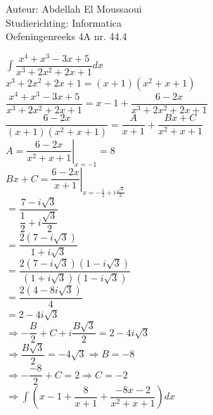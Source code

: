 \documentclass[a4paper]{article}
\begin{document}
  
\noindent \large Auteur: Abdellah El Moussaoui \\
\noindent \large Studierichting: Informatica\\
\noindent \large Oefeningenreeks 4A nr. 44.4\\

\medskip

\normalsize

$\displaystyle\int \dfrac{x^4+x^3-3x+5}{x^3+2x^2+2x+1}dx$\\

$x^3+2x^2+2x+1 = \left(x+1\right)\left(x^2+x+1\right)$\\

$\dfrac{x^4+x^3-3x+5}{x^3+2x^2+2x+1} = x-1+\dfrac{6-2x}{x^3+2x^2+2x+1}$\\

$\dfrac{6-2x}{\left(x+1\right)\left(x^2+x+1\right)} = \dfrac{A}{x+1}+\dfrac{Bx+C}{x^2+x+1}$\\

$A = \left.\dfrac{6-2x}{x^2+x+1}\right|_{x = -1} = 8$\\

$Bx + C = \left.\dfrac{6-2x}{x+1}\right|_{x = -\tfrac{1}{2}+i\tfrac{\sqrt3}{2}}$\\

$ = \dfrac{7-i\sqrt3}{\dfrac{1}{2}+i\dfrac{\sqrt3}{2}}$\\

$ = \dfrac{2\left(7-i\sqrt3\right)}{1+i\sqrt3}$\\


$ = \dfrac{2\left(7-i\sqrt3\right)\left(1-i\sqrt3\right)}{\left(1+i\sqrt3\right)\left(1-i\sqrt3\right)}$\\

$ = \dfrac{2\left(4-8i\sqrt3\right)}{4}$\\

$ = 2-4i\sqrt3$\\


$\Rightarrow -\dfrac{B}{2}+C+i\dfrac{B\sqrt3}{2} = 2-4i\sqrt3$\\

$\Rightarrow \dfrac{B\sqrt3}{2}=-4\sqrt3 \Rightarrow B= -8$\\

$\Rightarrow -\dfrac{-8}{2}+C=2 \Rightarrow C = -2$\\

$\Rightarrow \displaystyle\int\left(x-1+\dfrac{8}{x+1} + \dfrac{-8x-2}{x^2+x+1}\right)dx$\\
\end{document}
